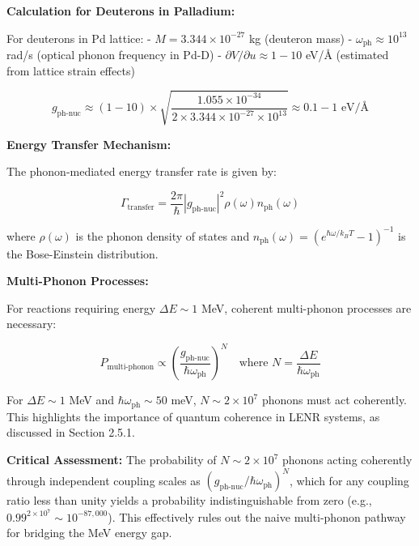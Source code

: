 \documentclass[11pt,a4paper]{article}
\begin{document}
\textbf{Calculation for Deuterons in Palladium:}

For deuterons in Pd lattice: - $M = 3.344 \times 10^{-27}$ kg (deuteron mass) - $\omega_{\text{ph}} \approx 10^{13}$ rad/s (optical phonon frequency in Pd-D) - $\partial V / \partial u \approx 1-10$ eV/\AA{} (estimated from lattice strain effects)

\begin{equation}
g_{\text{ph-nuc}} \approx (1-10) \times \sqrt{\frac{1.055 \times 10^{-34}}{2 \times 3.344 \times 10^{-27} \times 10^{13}}} \approx 0.1-1 \text{ eV/\AA{}}
\end{equation}

\textbf{Energy Transfer Mechanism:}

The phonon-mediated energy transfer rate is given by:

\begin{equation}
\Gamma_{\text{transfer}} = \frac{2\pi}{\hbar} |g_{\text{ph-nuc}}|^2 \rho(\omega) n_{\text{ph}}(\omega)
\end{equation}

where $\rho(\omega)$ is the phonon density of states and $n_{\text{ph}}(\omega) = (e^{\hbar\omega/k_B T} - 1)^{-1}$ is the Bose-Einstein distribution.

\textbf{Multi-Phonon Processes:}

For reactions requiring energy $\Delta E \sim 1$ MeV, coherent multi-phonon processes are necessary:

\begin{equation}
P_{\text{multi-phonon}} \propto \left(\frac{g_{\text{ph-nuc}}}{\hbar \omega_{\text{ph}}}\right)^{N} \quad \text{where } N = \frac{\Delta E}{\hbar \omega_{\text{ph}}}
\end{equation}

For $\Delta E \sim 1$ MeV and $\hbar \omega_{\text{ph}} \sim 50$ meV, $N \sim 2 \times 10^7$ phonons must act coherently. This highlights the importance of quantum coherence in LENR systems, as discussed in Section 2.5.1.

\textbf{Critical Assessment:} The probability of $N \sim 2 \times 10^7$ phonons acting coherently through independent coupling scales as $(g_{\text{ph-nuc}}/\hbar\omega_{\text{ph}})^N$, which for any coupling ratio less than unity yields a probability indistinguishable from zero (e.g., $0.99^{2 \times 10^7} \sim 10^{-87,000}$). This effectively rules out the naive multi-phonon pathway for bridging the MeV energy gap.
\end{document}
